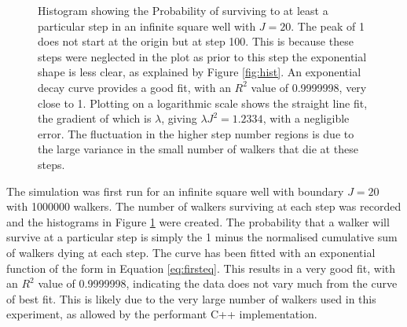 \documentclass[journal]{IEEEtran}
\begin{document}
\begin{figure}[ht!]
  \centering
  \centering
  \caption{Histogram showing the Probability of surviving to at least a
    particular step in an infinite square well with $J = 20$. The peak of 1 does
    not start at the origin but at step 100. This is because these steps were
    neglected in the plot as prior to this step the exponential shape is less
    clear, as explained by Figure \ref{fig:hist}. An exponential decay curve
    provides a good fit, with an $R^2$ value of 0.9999998, very close to
    1. Plotting on a logarithmic scale shows the straight line fit, the gradient
    of which is $\lambda$, giving $\lambda J^2 = 1.2334$, with a negligible
    error. The fluctuation in the higher step number regions is due to the large
    variance in the small number of walkers that die at these steps.}
  \label{fig:cumplots}
\end{figure}

The simulation was first run for an infinite square well with boundary $J=20$
with 1000000 walkers. The number of walkers surviving at each step was recorded
and the histograms in Figure \ref{fig:cumplots} were created. The probability
that a walker will survive at a particular step is simply the 1 minus the
normalised cumulative sum of walkers dying at each step. The curve has been
fitted with an exponential function of the form in Equation
\ref{eq:firsteq}. This results in a very good fit, with an $R^2$ value of
0.9999998, indicating the data does not vary much from the curve of best
fit. This is likely due to the very large number of walkers used in this
experiment, as allowed by the performant C++ implementation.
\end{document}
